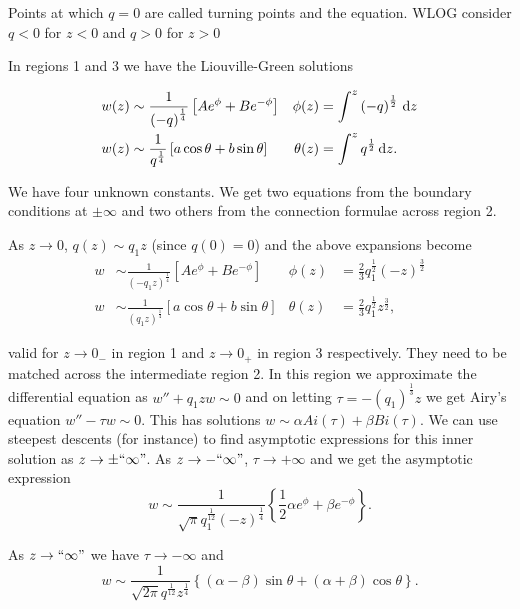 \documentclass{notes}
\theoremstyle{plain}
\begin{document}
Points at which $q=0$ are called turning points and the equation.  WLOG
consider $q<0$ for $z < 0$ and $q > 0$ for $z > 0$

\vspace{1in}

In regions 1 and 3 we have the Liouville-Green solutions

\begin{align*}
w(z) &\sim \frac{1}{\left(-q\right)^{\frac{1}{4}}} \left[
A e^{\phi} + B e^{-\phi}
\right]  &
\phi(z) &= \int^z \left(-q\right)^\frac{1}{2}\, \mathrm{d} z \\
w(z) &\sim \frac{1}{q^{\frac{1}{4}}} \left[ a \cos \theta
+ b \sin \theta \right] &
\theta(z) &= \int^z q^{\frac{1}{2}}\, \mathrm{d} z.
\end{align*}

We have four unknown constants.  We get two equations from the boundary
conditions at $\pm \infty$ and two others from the connection formulae
across region 2.

As $z \to 0$, $q(z) \sim q_1 z$ (since $q(0) = 0$) and the above
expansions become
\begin{align}
\label{eq:WKBJ1}
w &\sim \frac{1}{\left(-q_1 z\right)^{\frac{1}{4}}} \left[
A e^{\phi} + B e^{-\phi}
\right]  &
\phi(z) &= \frac{2}{3} q_1^{\frac{1}{2}} \left(-z\right)^{\frac{3}{2}}\\
\label{eq:WKBJ2}
w &\sim \frac{1}{\left(q_1 z\right)^{\frac{1}{4}}} \left[
a \cos \theta + b \sin \theta
\right]  &
\theta(z) &= \frac{2}{3} q_1^{\frac{1}{2}} z^{\frac{3}{2}},
\end{align}

valid for $z \to 0_-$ in region 1 and $z \to 0_+$ in region 3 respectively.
They need to be matched across the intermediate region 2.  In this
region we approximate the differential equation as
$w'' + q_1 z w \sim 0$ and on letting $\tau = - \left( q_1
\right)^{\frac{1}{3}} z$ we get Airy's equation $w'' - \tau w \sim 0$.  This
has solutions $w \sim \alpha Ai(\tau) + \beta Bi(\tau)$.  We can use
steepest descents (for instance) to find asymptotic expressions for this
inner solution as $z \to \pm ``\infty\text{''}$.  As $z \to
-``\infty\text{''}$, $\tau \to +\infty$ and we get the asymptotic expression
\begin{equation}\label{eq:WKBJi1}
w \sim \frac{1}{\sqrt{\pi} q_1^{\frac{1}{12}} \left(-z\right)^\frac{1}{4}}
\left\{\frac{1}{2} \alpha e^\phi + \beta e^{-\phi} \right\}.
\end{equation}

As $z \to ``\infty\text{''}$ we have $\tau \to -\infty$ and
\begin{equation}\label{eq:WKBJi2}
w \sim \frac{1}{\sqrt{2 \pi} q^{\frac{1}{12}} z^{\frac{1}{4}}}
\left\{
\left( \alpha - \beta \right) \sin \theta
+ \left( \alpha + \beta \right) \cos \theta
\right\}.
\end{equation}
\end{document}
